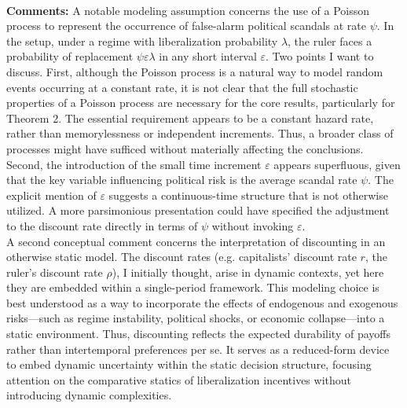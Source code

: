 \documentclass[10pt]{article}    %
\begin{document}
\\
\textbf{Comments:} A notable modeling assumption concerns the use of a Poisson process to represent the occurrence of false-alarm political scandals at rate $\psi$. In the setup, under a regime with liberalization probability $\lambda$, the ruler faces a probability of replacement $\psi \varepsilon \lambda$ in any short interval $\varepsilon$. Two points I want to discuss. First, although the Poisson process is a natural way to model random events occurring at a constant rate, it is not clear that the full stochastic properties of a Poisson process are necessary for the core results, particularly for Theorem 2. The essential requirement appears to be a constant hazard rate, rather than memorylessness or independent increments. Thus, a broader class of processes might have sufficed without materially affecting the conclusions. Second, the introduction of the small time increment $\varepsilon$ appears superfluous, given that the key variable influencing political risk is the average scandal rate $\psi$. The explicit mention of $\varepsilon$ suggests a continuous-time structure that is not otherwise utilized. A more parsimonious presentation could have specified the adjustment to the discount rate directly in terms of $\psi$ without invoking $\varepsilon$.\\
A second conceptual comment concerns the interpretation of discounting in an otherwise static model. The discount rates (e.g. capitalists’ discount rate $r$, the ruler’s discount rate $\rho$), I initially thought, arise in dynamic contexts, yet here they are embedded within a single-period framework. This modeling choice is best understood as a way to incorporate the effects of endogenous and exogenous risks---such as regime instability, political shocks, or economic collapse---into a static environment. Thus, discounting reflects the expected durability of payoffs rather than intertemporal preferences per se. It serves as a reduced-form device to embed dynamic uncertainty within the static decision structure, focusing attention on the comparative statics of liberalization incentives without introducing dynamic complexities.
\end{document}
